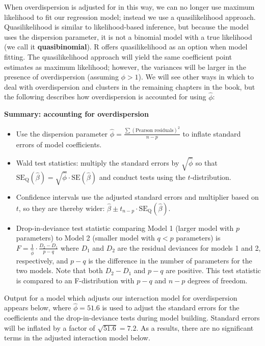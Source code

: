 \documentclass[
]{krantz}
\providecommand{\tightlist}{%
  \setlength{\itemsep}{0pt}\setlength{\parskip}{0pt}}
\begin{document}
When overdispersion is adjusted for in this way, we can no longer use maximum likelihood to fit our regression model; instead we use a quasilikelihood approach.  Quasilikelihood is similar to likelihood-based inference, but because the model uses the dispersion parameter, it is not a binomial model with a true likelihood (we call it \textbf{quasibinomial}).  R offers quasilikelihood as an option when model fitting. The quasilikelihood approach will yield the same coefficient point estimates as maximum likelihood; however, the variances will be larger in the presence of overdispersion (assuming \(\phi>1\)). We will see other ways in which to deal with overdispersion and clusters in the remaining chapters in the book, but the following describes how overdispersion is accounted for using \(\hat{\phi}\):
\vspace{5mm}

\textbf{Summary: accounting for overdispersion}

\begin{itemize}
\tightlist
\item
  Use the dispersion parameter \(\hat\phi=\frac{\sum(\textrm{Pearson residuals})^2}{n-p}\) to inflate standard errors of model coefficients.
\item
  Wald test statistics: multiply the standard errors by \(\sqrt{\hat{\phi}}\) so that \(\textrm{SE}_\textrm{Q}(\hat\beta)=\sqrt{\hat\phi}\cdot\textrm{SE}(\hat\beta)\) and conduct tests using the \(t\)-distribution.
\item
  Confidence intervals use the adjusted standard errors and multiplier based on \(t\), so they are thereby wider: \(\hat\beta \pm t_{n-p} \cdot \textrm{SE}_\textrm{Q}(\hat\beta)\).
\item
  Drop-in-deviance test statistic comparing Model 1 (larger model with \(p\) parameters) to Model 2 (smaller model with \(q<p\) parameters) is \(F = \frac{1}{\hat\phi} \cdot \frac{D_2 - D_1}{p-q}\) where \(D_1\) and \(D_2\) are the residual deviances for models 1 and 2, respectively, and \(p-q\) is the difference in the number of parameters for the two models. Note that both \(D_2-D_1\) and \(p-q\) are positive. This test statistic is compared to an F-distribution with \(p-q\) and \(n-p\) degrees of freedom.
\end{itemize}

Output for a model which adjusts our interaction model for overdispersion appears below, where \(\hat{\phi}=51.6\) is used to adjust the standard errors for the coefficients and the drop-in-deviance tests during model building. Standard errors will be inflated by a factor of \(\sqrt{51.6}=7.2\). As a results, there are no significant terms in the adjusted interaction model below.
\end{document}
